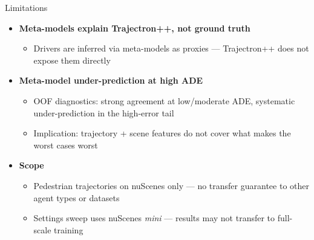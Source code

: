\begin{frame}{Limitations}
  \begin{itemize}[<+->]
    \item \textbf{Meta-models explain Trajectron++, not ground truth}
      \begin{itemize}[<1->]
        \item Drivers are inferred via meta-models as proxies —
              Trajectron++ does not expose them directly
      \end{itemize}
    \item \textbf{Meta-model under-prediction at high ADE}
      \begin{itemize}[<2->]
        \item OOF diagnostics: strong agreement at low/moderate ADE,
              systematic under-prediction in the high-error tail
        \item Implication: trajectory + scene features do not cover
              what makes the worst cases worst
      \end{itemize}
    \item \textbf{Scope}
      \begin{itemize}[<3->]
        \item Pedestrian trajectories on nuScenes only — no transfer
              guarantee to other agent types or datasets
        \item Settings sweep uses nuScenes \emph{mini} — results may
              not transfer to full-scale training
      \end{itemize}
  \end{itemize}
\end{frame}

